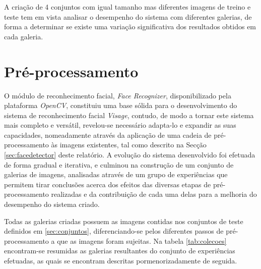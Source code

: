 A criação de 4 conjuntos com igual tamanho mas diferentes imagens de treino e teste tem em vista analisar o desempenho do sistema com diferentes galerias, de forma a determinar se existe uma variação significativa dos resultados obtidos em cada galeria.

\section{Pré-processamento} \label{sec:experiencias}
O módulo de reconhecimento facial, \textit{Face Recognizer}, disponibilizado pela plataforma \textit{OpenCV}, constituiu uma base sólida para o desenvolvimento do sistema de reconhecimento facial \textit{Visage}, contudo, de modo a tornar este sistema mais completo e versátil, revelou-se necessário adapta-lo e expandir as suas capacidades, nomeadamente através da aplicação de uma cadeia de pré-processamento às imagens existentes, tal como descrito na Secção \ref{sec:facedetector} deste relatório. A evolução do sistema desenvolvido foi efetuada de forma gradual e iterativa, e culminou na construção de um conjunto de galerias de imagens, analisadas através de um grupo de experiências que permitem tirar conclusões acerca dos efeitos das diversas etapas de pré-processamento realizadas e da contribuição de cada uma delas para a melhoria do desempenho do sistema criado. 

Todas as galerias criadas possuem as imagens contidas nos conjuntos de teste definidos em \ref{sec:conjuntos}, diferenciando-se pelos diferentes passos de pré-processamento a que as imagens foram sujeitas. Na tabela \ref{tab:colecoes} encontram-se resumidas as galerias resultantes do conjunto de experiências efetuadas, as quais se encontram descritas pormenorizadamente de seguida.

